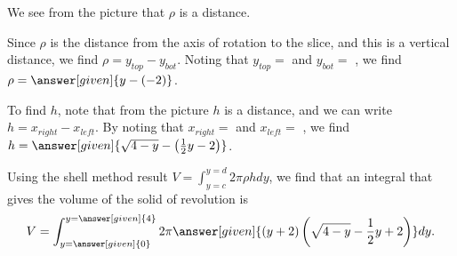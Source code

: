 \documentclass{ximera}
\begin{document}
\begin{example}
\begin{image}
            \end{image}
                       
 We see from the picture that $\rho$ is a  distance.            

Since $\rho$ is the distance from the axis of rotation to the slice, and this is a vertical distance, we find $\rho = y_{top}-y_{bot}$.  Noting that $y_{top}=$  and $y_{bot}=$ , we find $\rho= \answer[given]{y-(-2)}$.

To find $h$, note that from the picture $h$ is a  distance, and we can write $h = x_{right}-x_{left}$.  By noting that $x_{right}=$  and $x_{left} =$  , we find $h= \answer[given]{ \sqrt{4-y} - \left(\frac{1}{2}y-2\right)}$.

Using the shell method result $V = \int_{y=c}^{y=d} 2\pi \rho h dy$, we find that an integral that gives the volume of the solid of revolution is            
	\[
	V= \int_{y=\answer[given]{0}}^{y=\answer[given]{4}} 2 \pi \answer[given]{(y+2)\left( \sqrt{4-y} - \frac{1}{2}y +2 \right)}dy.
	\]

\end{example}
\end{document}
